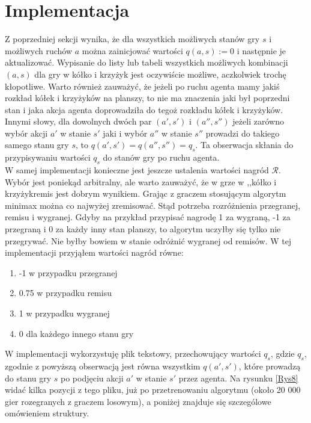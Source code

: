 \documentclass[licencjacka]{pracamgr}
\begin{document}
\section{Implementacja}

Z poprzedniej sekcji wynika, że dla wszystkich możliwych stanów gry $s$ i możliwych ruchów $a$ można zainicjować wartości $q(a,s):=0$ i następnie je aktualizować. Wypisanie do listy lub tabeli wszystkich możliwych kombinacji $(a,s)$ dla gry w kółko i krzyżyk jest oczywiście możliwe, aczkolwiek trochę kłopotliwe. Warto również zauważyć, że jeżeli po ruchu agenta  mamy jakiś rozkład kółek i krzyżyków na planszy, to nie ma znaczenia jaki był poprzedni stan i jaka akcja agenta doprowadziła do tegoż rozkładu kółek i krzyżyków. Innymi słowy, dla dowolnych dwóch par $(a', s')$ i $(a'', s'')$  jeżeli zarówno wybór akcji $a'$ w stanie $s'$ jaki i wybór $a''$ w stanie $s''$ prowadzi do takiego samego stanu gry $s$,  to $q(a', s') = q(a'', s'') = q_{s}$. Ta obserwacja skłania do przypisywaniu wartości $q_{s}$ do stanów gry po ruchu agenta. \\

W samej implementacji konieczne jest jeszcze ustalenia wartości nagród $\mathcal{R}$.  Wybór jest poniekąd arbitralny, ale warto zauważyć, że w grze w ,,kółko i krzyżyk\textquotedbl\enspace remis jest dobrym wynikiem. Grając z graczem stosującym algorytm minimax można co najwyżej zremisować. Stąd potrzeba rozróżnienia przegranej, remisu i wygranej. Gdyby na przykład przypisać nagrodę 1 za wygraną, -1 za przegraną i 0 za każdy inny stan planszy, to algorytm uczyłby się tylko nie przegrywać. Nie byłby bowiem w stanie odróżnić wygranej od remisów. W tej implementacji przyjąłem wartości nagród równe: 
\begin{enumerate}
	\item{-1 w przypadku przegranej}
	\item{0.75 w przypadku remisu }
	\item{1 w przypadku wygranej}
	\item{0 dla każdego innego stanu gry}
\end{enumerate}

W implementacji wykorzystuję plik tekstowy, przechowujący wartości $q_{s}$, gdzie $q_{s}$, zgodnie z powyższą obserwacją jest równa wszystkim  $q(a',s')$, które prowadzą do stanu gry $s$ po podjęciu akcji $a'$ w stanie $s'$ przez agenta. Na rysunku \ref{Rys8} widać kilka pozycji z tego pliku, już po przetrenowaniu algorytmu (około 20 000 gier rozegranych z graczem losowym), a poniżej znajduje się szczególowe omówieniem struktury.
\end{document}
